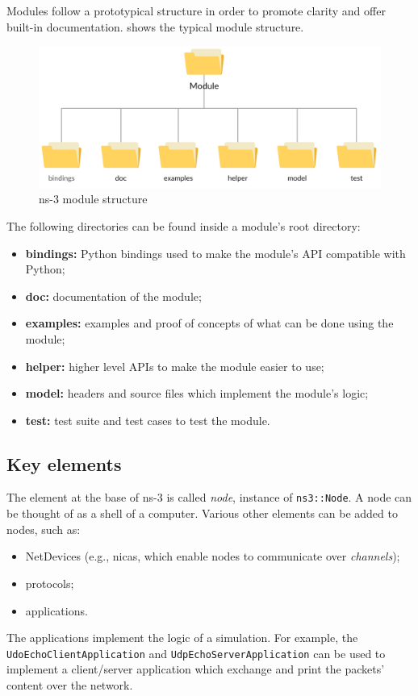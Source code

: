 		
		Modules follow a prototypical structure in order to promote clarity and offer built-in documentation.  shows the typical module structure.
		
		\begin{figure}[H]
			\centering
			\includegraphics[width=\textwidth]{immagini/ns-3-module}
			\caption{ns-3 module structure}
			\label{fig:ns-3-module}
		\end{figure}
		
		The following directories can be found inside a module's root directory:
		\begin{itemize}
			\item \textbf{bindings:} Python bindings used to make the module's API compatible with Python;
			\item \textbf{doc:} documentation of the module;
			\item \textbf{examples:} examples and proof of concepts of what can be done using the module;
			\item \textbf{helper:} higher level APIs to make the module easier to use;
			\item \textbf{model:} headers and source files which implement the module's logic; 
			\item \textbf{test:} test suite and test cases to test the module.
		\end{itemize}
	
		\subsection{Key elements}
			The element at the base of ns-3 is called \textit{node}, instance of \texttt{ns3::Node}. A node can be thought of as a shell of a computer. Various other elements can be added to nodes, such as:
			\begin{itemize}
				\item NetDevices (e.g., \acrshort{nica}s, which enable nodes to communicate over \textit{channels});
				\item protocols;
				\item applications. 
			\end{itemize}
			The applications implement the logic of a simulation. For example, the \texttt{UdoEchoClientApplication} and \texttt{UdpEchoServerApplication} can be used to implement a client/server application which exchange and print the packets' content over the network.
			
